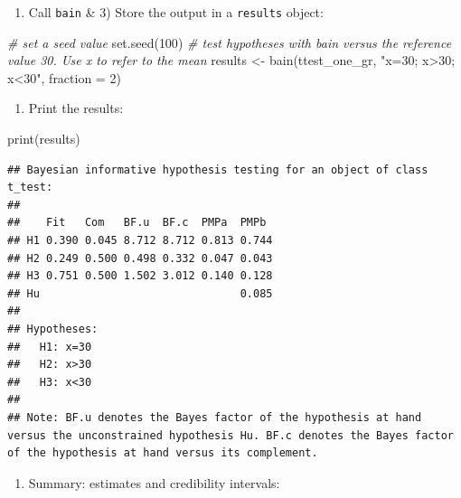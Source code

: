 \documentclass[
]{book}
\newenvironment{Shaded}{\begin{snugshade}}{\end{snugshade}}
\newcommand{\AttributeTok}[1]{\textcolor[rgb]{0.77,0.63,0.00}{#1}}
\newcommand{\CommentTok}[1]{\textcolor[rgb]{0.56,0.35,0.01}{\textit{#1}}}
\newcommand{\DecValTok}[1]{\textcolor[rgb]{0.00,0.00,0.81}{#1}}
\newcommand{\FunctionTok}[1]{\textcolor[rgb]{0.00,0.00,0.00}{#1}}
\newcommand{\NormalTok}[1]{#1}
\newcommand{\OtherTok}[1]{\textcolor[rgb]{0.56,0.35,0.01}{#1}}
\newcommand{\StringTok}[1]{\textcolor[rgb]{0.31,0.60,0.02}{#1}}
\providecommand{\tightlist}{%
  \setlength{\itemsep}{0pt}\setlength{\parskip}{0pt}}
\begin{document}
\begin{enumerate}
\def\labelenumi{\arabic{enumi})}
\setcounter{enumi}{1}
\tightlist
\item
  Call \texttt{bain} \& 3) Store the output in a \texttt{results} object:
\end{enumerate}

\begin{Shaded}
\begin{Highlighting}[]
\CommentTok{\# set a seed value}
\FunctionTok{set.seed}\NormalTok{(}\DecValTok{100}\NormalTok{)}
\CommentTok{\# test hypotheses with bain versus the reference value 30. Use x to refer to the mean}
\NormalTok{results }\OtherTok{\textless{}{-}} \FunctionTok{bain}\NormalTok{(ttest\_one\_gr, }\StringTok{"x=30; x\textgreater{}30; x\textless{}30"}\NormalTok{, }\AttributeTok{fraction =} \DecValTok{2}\NormalTok{)}
\end{Highlighting}
\end{Shaded}

\begin{enumerate}
\def\labelenumi{\arabic{enumi})}
\setcounter{enumi}{2}
\tightlist
\item
  Print the results:
\end{enumerate}

\begin{Shaded}
\begin{Highlighting}[]
\FunctionTok{print}\NormalTok{(results)}
\end{Highlighting}
\end{Shaded}

\begin{verbatim}
## Bayesian informative hypothesis testing for an object of class t_test:
## 
##    Fit   Com   BF.u  BF.c  PMPa  PMPb 
## H1 0.390 0.045 8.712 8.712 0.813 0.744
## H2 0.249 0.500 0.498 0.332 0.047 0.043
## H3 0.751 0.500 1.502 3.012 0.140 0.128
## Hu                               0.085
## 
## Hypotheses:
##   H1: x=30
##   H2: x>30
##   H3: x<30
## 
## Note: BF.u denotes the Bayes factor of the hypothesis at hand versus the unconstrained hypothesis Hu. BF.c denotes the Bayes factor of the hypothesis at hand versus its complement.
\end{verbatim}

\begin{enumerate}
\def\labelenumi{\arabic{enumi})}
\setcounter{enumi}{3}
\tightlist
\item
  Summary: estimates and credibility intervals:
\end{enumerate}
\end{document}

